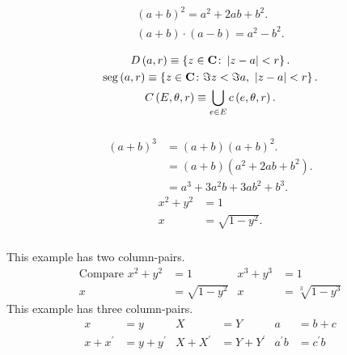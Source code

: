 \begin{frame}[fragile]
	\frametitle{\secname}

	\begin{gather}
		\left(a+b\right)^{2}=a^{2}+2ab+b^{2}. \\
		\left(a+b\right)\cdot\left(a-b\right)=
		a^{2}-b^{2}.
	\end{gather}

	\begin{gather}
		D\left(a,r\right)\equiv
		\left\{z\in\mathbf{C}\colon \left|z-a\right|<r\right\}. \notag \\
		\operatorname{seg}\left(a,r\right)\equiv
		\left\{
		z\in\mathbf{C}\colon
		\Im z<\Im a,\ \left|z-a\right|< r \right\}. \\
		C\left(E,\theta,r\right)\equiv
		\bigcup_{e \in E}
		c\left(e,\theta,r\right).
	\end{gather}
\end{frame}

\begin{frame}[fragile]
	\frametitle{\secname}

	\begin{align}
		\left(a+b\right)^{3} & = \left(a+b\right)\left(a+b\right)^{2}.         \\
		                     & = \left(a+b\right)\left(a^{2}+2ab+b^{2}\right). \\
		                     & = a^{3}+3a^{2}b+3ab^{2}+b^{3}.
	\end{align}
	\begin{align}
		x^{2} + y^{2} & = 1             \\
		x             & = \sqrt{1-y^2}.
	\end{align}
\end{frame}

\begin{frame}[fragile]
	\frametitle{\secname}

	This example has two column-pairs.
	\begin{align}
		\text{Compare }
		x^{2}+y^{2} & = 1              & x^{3} + y^{3} & = 1                 \\
		x           & = \sqrt{1-y^{2}} & x             & = \sqrt[3]{1-y^{3}}
	\end{align}
	This example has three column-pairs.
	\begin{align}
		x              & = y              & X              & = Y              & a           & = b+c         \\
		x + x^{\prime} & = y + y^{\prime} & X + X^{\prime} & = Y + Y^{\prime} & a^{\prime}b & = c^{\prime}b
	\end{align}
\end{frame}

